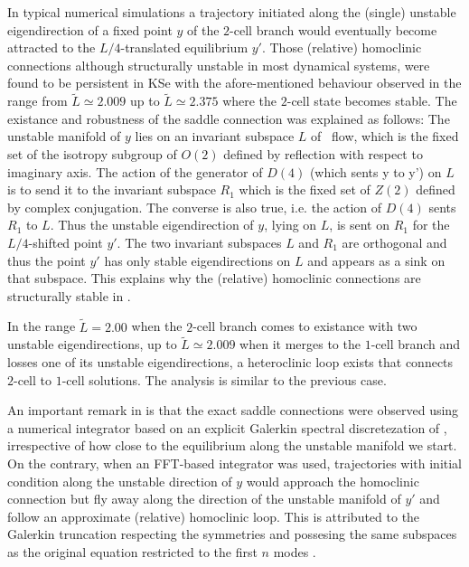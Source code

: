 In typical numerical simulations  a trajectory initiated along the (single) unstable eigendirection of a
fixed point $y$ of the $2$-cell branch would eventually become attracted to the $L/4$-translated equilibrium $y'$. 
Those (relative) homoclinic connections 
 although structurally unstable in most dynamical systems, were found to be persistent in KSe with the afore-mentioned behaviour observed in the range  
from $\tilde{L}\simeq 2.009$ up to $\tilde{L}\simeq 2.375$  where the $2$-cell state becomes stable. The existance and
robustness of the saddle connection was explained as follows:  The unstable manifold of $y$ lies on an invariant subspace $L$ of
\KS\ flow, which is the fixed set of the isotropy subgroup of $O(2)$ defined by reflection with respect to imaginary axis. The action of the generator of $D(4)$ (which sents y to y') on $L$ is to send it to the invariant subspace $R_{1}$ which is the fixed set of $Z(2)$ defined by complex
conjugation. The converse is also true, i.e. the action of $D(4)$ sents $R_{1}$ to $L$. Thus the unstable eigendirection of $y$, lying on $L$, is sent on $R_{1}$ for the $L/4$-shifted point $y'$. The two invariant subspaces $L$ and $R_{1}$ are orthogonal and thus the point $y'$ has only stable eigendirections on $L$ and appears as a sink on that subspace. This explains why the (relative) homoclinic connections are structurally stable in \KSe.

In the range $\tilde{L}=2.00$ when the $2$-cell branch comes to existance with two unstable eigendirections, up to $\tilde{L} \simeq 2.009$ when it
merges to the $1$-cell branch and losses one of its unstable eigendirections, a heteroclinic loop exists that connects $2$-cell to $1$-cell solutions.
The analysis is similar to the previous case.

An important remark in  is that the exact saddle connections were observed using a numerical integrator based on an explicit Galerkin spectral discretezation of \KSe, irrespective of how close to the equilibrium along the unstable manifold we start. On the contrary, when an FFT-based integrator was used, trajectories with initial condition along the unstable direction of $y$ would approach the homoclinic connection but fly away along the direction of the unstable manifold of $y'$ and follow an approximate (relative) homoclinic loop. This is attributed to the Galerkin truncation respecting the symmetries and possesing the same subspaces as the original equation restricted to the first $n$ modes .





